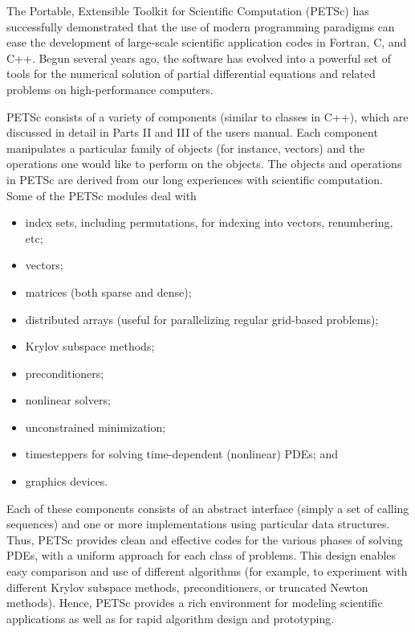 
%
%
%

The Portable, Extensible Toolkit for Scientific Computation (PETSc)
has successfully demonstrated that the use of modern programming
paradigms can ease the development of large-scale scientific
application codes in Fortran, C, and C++.  Begun several years ago,
the software has evolved into a powerful set of tools for the
numerical solution of partial differential equations and related problems 
on high-performance computers.

PETSc consists of a variety of components (similar to classes in C++),
which are discussed in detail in Parts II and III of the users manual.
Each component manipulates a particular family of objects (for instance,
vectors) and the operations one would like to perform on the objects.
The objects and operations in PETSc are derived from our long 
experiences with scientific computation. Some of the PETSc modules deal with 
\begin{itemize} 
\item index sets, including permutations, for indexing into vectors, renumbering, etc;
\item vectors;
\item matrices (both sparse and dense);
\item distributed arrays (useful for parallelizing regular grid-based 
      problems);
\item Krylov subspace methods;
\item preconditioners;
\item nonlinear solvers;
\item unconstrained minimization;
\item timesteppers for solving time-dependent (nonlinear) PDEs; and
\item graphics devices.
\end{itemize}
Each of these components consists of an abstract interface 
(simply a set of calling sequences) and one or more implementations 
using particular data structures. Thus, PETSc provides clean and 
effective codes for the various phases of solving PDEs, with a uniform 
approach for each class of problems.  This design
enables easy comparison and use of different algorithms (for example,
to experiment with different Krylov subspace methods, preconditioners,
or truncated Newton methods).
Hence, PETSc provides a rich environment for modeling scientific
applications as well as for rapid algorithm design and prototyping.

